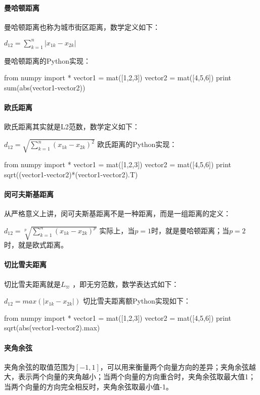 \documentclass[11pt]{book}
\newcounter{#2}
\newcounter{#2}[#1]
\numberwithin{#2}{#1}
\begin{document}
\paragraph{曼哈顿距离}

曼哈顿距离也称为城市街区距离，数学定义如下：

$ d_{12} =\sum_{k=1}^{n}{\left| x_{1k}-x_{2k} \right| } $ 

曼哈顿距离的Python实现：

from numpy import *
vector1 = mat([1,2,3])
vector2 = mat([4,5,6])
print sum(abs(vector1-vector2))
\paragraph{欧氏距离}

欧氏距离其实就是L2范数，数学定义如下： 

$ d_{12} =\sqrt{\sum_{k=1}^{n}{\left( x_{1k} -x_{2k}  \right) ^{2} } }  $
欧氏距离的Python实现：

from numpy import *
vector1 = mat([1,2,3])
vector2 = mat([4,5,6])
print sqrt((vector1-vector2)*(vector1-vector2).T)
\paragraph{闵可夫斯基距离}

从严格意义上讲，闵可夫斯基距离不是一种距离，而是一组距离的定义：

$ d_{12} =\sqrt[p]{\sum_{k=1}^{n}{\left( x_{1k} -x_{2k}  \right) ^{p} } }  $
实际上，当$ p=1 $时，就是曼哈顿距离；当$ p=2 $时，就是欧式距离。

\paragraph{切比雪夫距离}

切比雪夫距离就是$ L_{\varpi} $ ，即无穷范数，数学表达式如下：

$ d_{12} =max\left( \left| x_{1k}-x_{2k} \right|  \right)  $
切比雪夫距离额Python实现如下：

from numpy import *
vector1 = mat([1,2,3])
vector2 = mat([4,5,6])
print sqrt(abs(vector1-vector2).max)
\paragraph{夹角余弦}

夹角余弦的取值范围为$ [-1,1] $，可以用来衡量两个向量方向的差异；夹角余弦越大，表示两个向量的夹角越小；当两个向量的方向重合时，夹角余弦取最大值1；当两个向量的方向完全相反时，夹角余弦取最小值-1。
\end{document}

